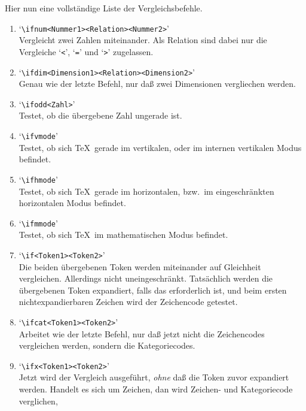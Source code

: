 Hier nun eine vollst\"andige Liste der
Vergleichsbefehle.
\begin{enumerate}
\item {}
`\verb|\ifnum<Nummer1><Relation><Nummer2>|'\\Vergleicht zwei
Zahlen miteinander. Als 
Relation sind dabei nur die Vergleiche
`\verb|<|', `\verb|=|' und `\verb|>|' zugelassen.
\item {}
`\verb|\ifdim<Dimension1><Relation><Dimension2>|'\\Genau wie der
letzte Befehl, nur da\ss{} zwei Dimensionen vergliechen werden.
\item {}
`\verb|\ifodd<Zahl>|'\\Testet, ob die \"ubergebene Zahl ungerade
ist.
\item {}
`\verb|\ifvmode|'\\Testet, ob sich \TeX\ gerade im vertikalen,
oder im internen vertikalen Modus befindet.
\item {}
`\verb|\ifhmode|'\\Testet, ob sich \TeX\ gerade im horizontalen,
bzw.\ im eingeschr\"ankten horizontalen Modus befindet.
\item {}
`\verb|\ifmmode|'\\Testet, ob sich \TeX\ im mathematischen Modus
befindet.
\item `\verb|\if<Token1><Token2>|'\\Die beiden \"ubergebenen Token
werden miteinander auf Gleichheit vergleichen. Allerdings nicht
uneingeschr\"ankt. Tats\"achlich werden die \"ubergebenen Token expandiert,
falls das erforderlich ist, und beim ersten nichtexpandierbaren
Zeichen wird der Zeichencode getestet.
\item {}
`\verb|\ifcat<Token1><Token2>|'\\Arbeitet wie der letzte Befehl,
nur da\ss{} jetzt nicht die Zeichencodes vergleichen werden, sondern die
Kategoriecodes.
\item {}
`\verb|\ifx<Token1><Token2>|'\\Jetzt wird der Vergleich
ausgef\"uhrt, {\em ohne} da\ss{} die Token zuvor expandiert werden. Handelt
es sich um Zeichen, dan wird Zeichen- und Kategoriecode verglichen,

\end{enumerate}
